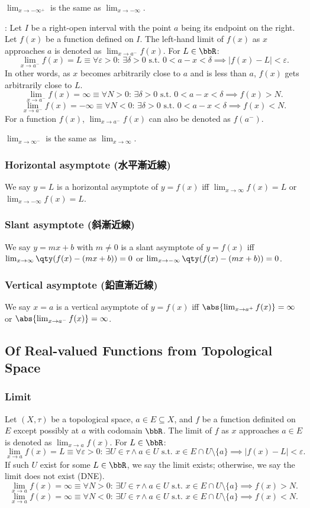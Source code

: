 $\lim_{x\to-\infty^+}$ is the same as $\lim_{x\to-\infty}$.

: Let \(I\) be a right-open interval with the point \(a\) being its endpoint on the right. Let \( f(x) \) be a function defined on \(I\). The left-hand limit of \( f(x) \) as \( x \) approaches \( a \) is denoted as $\lim_{x \to a^-} f(x)$. For $L\in\bbR$:
\[\lim_{x \to a^-} f(x) = L \equiv \forall \varepsilon > 0 :\,\exists \delta > 0 \text{\ s.t.\ } 0 < a - x < \delta \implies |f(x) - L| < \varepsilon.\]
In other words, as \(x\) becomes arbitrarily close to \(a\) and is less than \(a\), \(f(x)\) gets arbitrarily close to \(L\).
\[\lim_{x\to a^-}f(x)=\infty \equiv \forall N > 0:\, \exists \delta > 0 \text{\ s.t.\ } 0 < a - x < \delta \implies f(x) > N.\]
\[\lim_{x\to a^-}f(x)=-\infty \equiv \forall N < 0:\, \exists \delta > 0 \text{\ s.t.\ } 0 < a - x < \delta \implies f(x) < N.\]
For a function $f(x)$, $\lim_{x\to a^-}f(x)$ can also be denoted as $f(a^-)$.

$\lim_{x\to\infty^-}$ is the same as $\lim_{x\to\infty}$.
\subsubsection{Horizontal asymptote (水平漸近線)}
We say $y=L$ is a horizontal asymptote of $y=f(x)$ iff $\lim_{x \to \infty} f(x)=L$ or $\lim_{x \to -\infty} f(x)=L$.
\subsubsection{Slant asymptote (斜漸近線)}
We say $y=mx+b$ with $m\neq 0$ is a slant asymptote of $y=f(x)$ iff $\lim_{x \to \infty} \qty(f(x)-(mx+b))=0$ or $\lim_{x \to -\infty} \qty(f(x)-(mx+b))=0$.
\subsubsection{Vertical asymptote (鉛直漸近線)}
We say $x=a$ is a vertical asymptote of $y=f(x)$ iff $\abs{\lim_{x \to a^+} f(x)}=\infty$ or $\abs{\lim_{x \to a^-} f(x)}=\infty$.
\subsection{Of Real-valued Functions from Topological Space}
\subsubsection{Limit}
Let $(X,\tau)$ be a topological space, $a\in E\subseteq X$, and $f$ be a function definited on $E$ except possibly at $a$ with codomain $\bbR$. The limit of $f$ as $x$ approaches $a\in E$ is denoted as $\lim_{x\to a}f(x)$. For $L\in\bbR$:
\[\lim_{x \to a} f(x) = L \equiv \forall \varepsilon > 0:\, \exists U\in\tau\land a\in U \text{\ s.t.\ } x\in E\cap U\setminus\{a\} \implies |f(x) - L| < \varepsilon.\]
If such $U$ exist for some $L\in\bbR$, we say the limit exists; otherwise, we say the limit does not exist (DNE).
\[\lim_{x\to a}f(x)=\infty \equiv \forall N > 0:\, \exists U\in\tau\land a\in U \text{\ s.t.\ }x\in E\cap U\setminus\{a\}\implies f(x) > N.\]
\[\lim_{x\to a}f(x)=\infty \equiv \forall N < 0:\, \exists U\in\tau\land a\in U \text{\ s.t.\ }x\in E\cap U\setminus\{a\}\implies f(x) < N.\]
